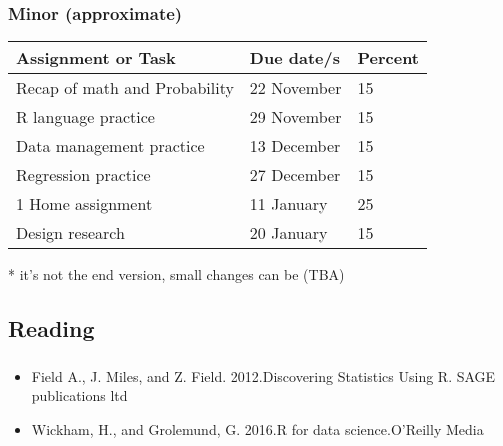 \documentclass[t, 11pt]{beamer}
\begin{document}
	
	\begin{frame}\label{}
		\frametitle{\insertsection}
		\frametitle{Minor  (approximate)}
		\begin{table}[]
			\begin{threeparttable}
				\begin{tabular}{@{}lll@{}}
					\toprule
					\textbf{Assignment or Task}   & \textbf{Due date/s} & \textbf{Percent} \\ \midrule
					Recap of math and Probability & 22 November         & 15      \\
					R language practice           & 29 November         & 15      \\
					Data management practice      & 13 December         & 15                \\
					Regression practice           & 27 December         & 15                \\
					1 Home assignment             & 11 January          & 25               \\
					Design research               & 20 January          & 15                \\
				\end{tabular}
				\begin{tablenotes}\footnotesize
					\item[*]  it's not the end version, small changes can be (TBA)
				\end{tablenotes}
			\end{threeparttable}
		\end{table}
	\end{frame}
	
	
	
	\subsection{Reading}
	\begin{frame}\label{}
		\frametitle{\insertsection}
		\frametitle{\insertsubsection}
		\begin{itemize}
			\item Field A., J. Miles, and Z. Field. 2012.Discovering Statistics Using R. SAGE publications ltd
			\item Wickham, H., and Grolemund, G. 2016.R for data science.O’Reilly Media
		\end{itemize}
	\end{frame}
	
\end{document}
